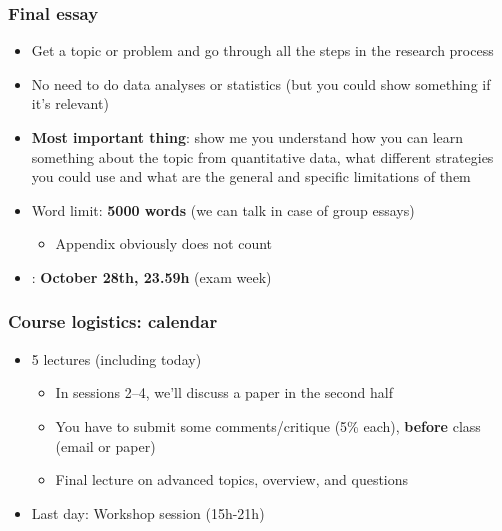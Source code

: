 \documentclass[aspectratio=43]{beamer}
\begin{document}
\begin{frame}
\frametitle{Final essay}
\centering

\begin{itemize}
  \item Get a topic or problem and go through all the steps in the research process
  \item No need to do data analyses or statistics (but you could show something if it's relevant)
  \item \textbf{Most important thing}: show me you understand how you can learn something about the topic from quantitative data, what different strategies you could use and what are the general and specific limitations of them
  \item Word limit: \textbf{5000 words} (we can talk in case of group essays)
  \begin{itemize}
    \item Appendix obviously does not count
  \end{itemize}
  \item {\color{red}{Deadline}}: \textbf{October 28th, 23.59h} (exam week)
\end{itemize}

\end{frame}

\begin{frame}
\frametitle{Course logistics: calendar}
\centering

\begin{itemize}
  \item 5 lectures (including today)
  \begin{itemize}
    \item In sessions 2--4, we'll discuss a paper in the second half
    \item You have to submit some comments/critique (5\% each), \textbf{before} class (email or paper)
    \item Final lecture on advanced topics, overview, and questions
  \end{itemize}
  \item Last day: Workshop session (15h-21h)
\end{itemize}

\end{frame}
\end{document}

